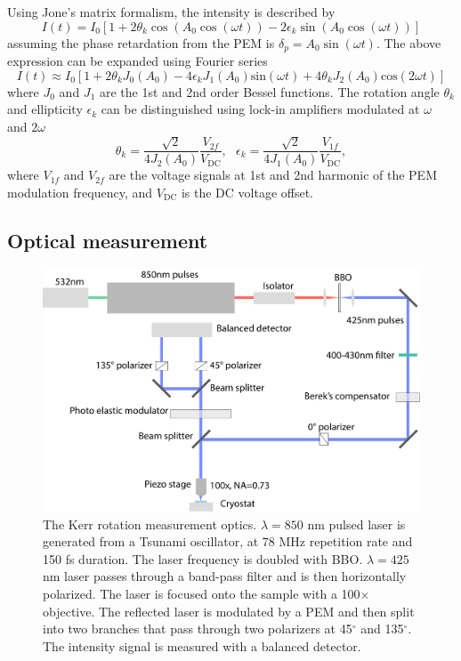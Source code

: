 \documentclass[pdflatex, sectionletters, 12pt, final, phd]{pittetd}    %
\begin{document}
Using Jone's matrix formalism, the intensity is described by\cite{bennemann1998non}
$$
I(t) = I_0[1 + 2\theta_k \cos(A_0 \cos(\omega t)) - 2\epsilon_k \sin(A_0 \cos(\omega t))]
$$
assuming the phase retardation from the PEM is $\delta_p = A_0 \sin(\omega t)$. The above expression can be expanded using Fourier series
$$
I(t) \approx I_0[1+2\theta_k J_0(A_0) - 4\epsilon_k J_1(A_0)\mathrm{sin}(\omega t) + 4\theta_k J_2(A_0)\mathrm{cos}(2\omega t)]
$$
where $J_0$ and $J_1$ are the 1st and 2nd order Bessel functions. The rotation angle $\theta_k$ and ellipticity $\epsilon_k$ can be distinguished using lock-in amplifiers modulated at $\omega$ and $2\omega$
$$
\theta_k = \frac{\sqrt{2}}{4J_2(A_0)}\frac{V_{2f}}{V_{\mathrm{DC}}}, \ \ \ 
\epsilon_k = \frac{\sqrt{2}}{4J_1(A_0)}\frac{V_{1f}}{V_{\mathrm{DC}}},
$$
where $V_{1f}$ and $V_{2f}$ are the voltage signals at 1st and 2nd harmonic of the PEM modulation frequency, and $V_\mathrm{DC}$ is the DC voltage offset.

\subsection{Optical measurement}

\begin{figure}[p]
	\centering
	\includegraphics[width=.9\textwidth]{Drawing/KerrOptics.pdf}
	\caption[The Kerr rotation measurement optics]{The Kerr rotation measurement optics. $\lambda = 850$ nm pulsed laser is generated from a Tsunami oscillator, at 78 MHz repetition rate and 150 fs duration. The laser frequency is doubled with BBO. $\lambda = 425$ nm laser passes through a band-pass filter and is then horizontally polarized. The laser is focused onto the sample with a 100$\times$ objective. The reflected laser is modulated by a PEM and then split into two branches that pass through two polarizers at 45$^{\circ}$ and 135$^{\circ}$. The intensity signal is measured with a balanced detector.}
	\label{FIG:KerrOptics}
\end{figure}
\end{document}
